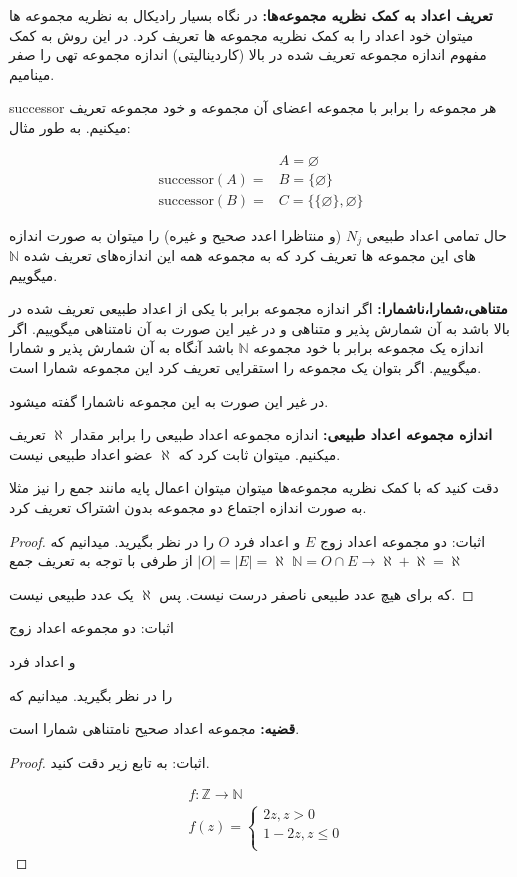 \textbf{تعریف اعداد به کمک نظریه مجموعه‌ها:}
در نگاه بسیار رادیکال به نظریه مجموعه ها میتوان خود اعداد را به کمک نظریه مجموعه ها تعریف کرد. در این
روش به کمک مفهوم اندازه مجموعه تعریف شده در بالا
(کاردینالیتی)
اندازه مجموعه تهی را صفر مینامیم.

successor 
هر مجموعه را برابر با مجموعه اعضای آن مجموعه و خود مجموعه تعریف میکنیم. به طور مثال:

\begin{align*}
    &A = \varnothing\\
    \text{successor}(A)= &B = \{\varnothing\}\\
    \text{successor}(B) = &C = \{\{\varnothing\}, \varnothing\}
\end{align*}

حال تمامی اعداد طبیعی
$N_j$
(و منتاظرا اعدد صحیح و غیره)
را میتوان به صورت اندازه های این مجموعه ها تعریف کرد که به مجموعه همه این اندازه‌های تعریف شده 
$\mathbb{N}$
میگوییم.

\textbf{متناهی،‌شمارا،‌ناشمارا:}
اگر اندازه مجموعه برابر با یکی از اعداد طبیعی تعریف شده در بالا باشد به آن شمارش پذیر و متناهی و در
غیر این صورت به آن نامتناهی میگوییم.
اگر اندازه یک مجموعه برابر با خود مجموعه 
$\mathbb{N}$
باشد آنگاه به آن شمارش پذیر و شمارا میگوییم.
اگر بتوان یک مجموعه را استقرایی تعریف کرد این مجموعه شمارا است.

در غیر این صورت به این مجموعه ناشمارا گفته میشود.


\textbf{اندازه مجموعه اعداد طبیعی:}
اندازه مجموعه اعداد طبیعی را برابر مقدار
$\aleph$
تعریف میکنیم. میتوان ثابت کرد که 
$\aleph$
عضو اعداد طبیعی نیست.

دقت کنید که با کمک نظریه مجموعه‌ها میتوان میتوان اعمال پایه مانند جمع را نیز مثلا به صورت اندازه اجتماع دو مجموعه بدون اشتراک تعریف کرد.

\begin{proof}
    اثبات:
    دو مجموعه اعداد زوج 
$E$
    و اعداد فرد
$O$
    را در نظر بگیرید.
    میدانیم که
$|O|=|E|=\aleph$
از طرفی با توجه به تعریف جمع
$\mathbb{N} = O \cap E \longrightarrow \aleph + \aleph =\aleph$

که برای هیچ عدد طبیعی ناصفر درست نیست. پس
$\aleph$
یک عدد طبیعی نیست.
\end{proof}
اثبات:
دو مجموعه اعداد زوج 

و اعداد فرد

را در نظر بگیرید.
میدانیم که


\textbf{قضیه:}
مجموعه اعداد صحیح نامتناهی شمارا است.

\begin{proof}
    اثبات: به تابع زیر دقت کنید.

    \begin{align*}
        &f: \mathbb{Z} \rightarrow \mathbb{N}\\
        &f(z) = 
        \begin{cases}
            2z, z > 0\\
            1 - 2z, z \leq 0\\
        \end{cases}
    \end{align*}
\end{proof}

